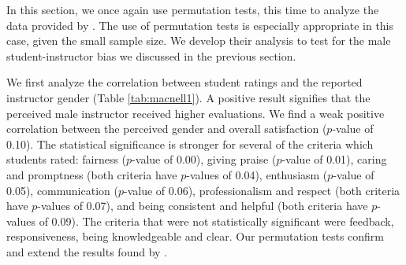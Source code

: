 \documentclass[12pt]{article}
\begin{document}
In this section, we once again use permutation tests, this time to analyze the data provided by \citet{MacNell2014}. The use of permutation tests is especially appropriate in this case, given the small sample size. We develop their analysis to test for the male student-instructor bias we discussed in the previous section. 

We first analyze the correlation between student ratings and the reported instructor gender (Table \ref{tab:macnell1}). A positive result signifies that the perceived male instructor received higher evaluations. We find a weak positive correlation between the perceived gender and overall satisfaction ($p$-value of 0.10). The statistical significance is stronger for several of the criteria which students rated: fairness ($p$-value of 0.00), giving praise ($p$-value of 0.01), caring and promptness (both criteria have $p$-values of 0.04), enthusiasm ($p$-value of 0.05), communication ($p$-value of 0.06), professionalism and respect (both criteria have $p$-values of 0.07), and being consistent and helpful (both criteria have $p$-values of 0.09). The criteria that were not statistically significant were feedback, responsiveness, being knowledgeable and clear. Our permutation tests confirm and extend the results found by \citet{MacNell2014}.
\end{document}
